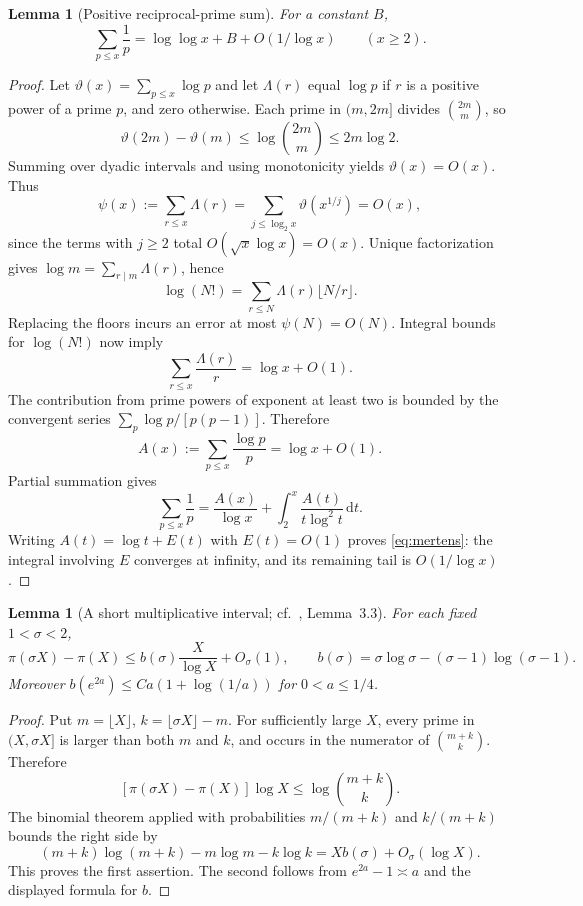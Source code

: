 \documentclass[11pt]{article}
\newtheorem{lemma}[theorem]{Lemma}
\theoremstyle{remark}\newtheorem{remark}[theorem]{Remark}
\newcommand{\dd}{\,\mathrm d}
\begin{document}
\begin{lemma}[Positive reciprocal-prime sum]\label{lem:mertens}
For a constant $B$,
\begin{equation}\label{eq:mertens}
 \sum_{p\le x}\frac1p=\log\log x+B+O(1/\log x)
 \qquad(x\ge2).
\end{equation}
\end{lemma}
\begin{proof}
Let $\vartheta(x)=\sum_{p\le x}\log p$ and let $\Lambda(r)$ equal $\log p$ if $r$ is a positive power of a prime $p$, and zero otherwise. Each prime in $(m,2m]$ divides $\binom{2m}{m}$, so
\[
 \vartheta(2m)-\vartheta(m)\le\log\binom{2m}{m}\le2m\log2.
\]
Summing over dyadic intervals and using monotonicity yields $\vartheta(x)=O(x)$. Thus
\[
 \psi(x):=\sum_{r\le x}\Lambda(r)
 =\sum_{j\le\log_2x}\vartheta(x^{1/j})=O(x),
\]
since the terms with $j\ge2$ total $O(\sqrt x\log x)=O(x)$. Unique factorization gives $\log m=\sum_{r\mid m}\Lambda(r)$, hence
\[
 \log(N!)=\sum_{r\le N}\Lambda(r)\lfloor N/r\rfloor.
\]
Replacing the floors incurs an error at most $\psi(N)=O(N)$. Integral bounds for $\log(N!)$ now imply
\[
 \sum_{r\le x}\frac{\Lambda(r)}r=\log x+O(1).
\]
The contribution from prime powers of exponent at least two is bounded by the convergent series $\sum_p\log p/[p(p-1)]$. Therefore
\[
 A(x):=\sum_{p\le x}\frac{\log p}{p}=\log x+O(1).
\]
Partial summation gives
\[
 \sum_{p\le x}\frac1p
 =\frac{A(x)}{\log x}+\int_2^x\frac{A(t)}{t\log^2t}\dd t.
\]
Writing $A(t)=\log t+E(t)$ with $E(t)=O(1)$ proves \eqref{eq:mertens}: the integral involving $E$ converges at infinity, and its remaining tail is $O(1/\log x)$.
\end{proof}

\begin{lemma}[A short multiplicative interval; cf.~\cite{Richter}, Lemma~3.3]\label{lem:interval}
For each fixed $1<\sigma<2$,
\[
 \pi(\sigma X)-\pi(X)
 \le b(\sigma)\frac X{\log X}+O_\sigma(1),\qquad
 b(\sigma)=\sigma\log\sigma-(\sigma-1)\log(\sigma-1).
\]
Moreover $b(e^{2a})\le C a(1+\log(1/a))$ for $0<a\le1/4$.
\end{lemma}
\begin{proof}
Put $m=\lfloor X\rfloor$, $k=\lfloor\sigma X\rfloor-m$. For sufficiently large $X$, every prime in $(X,\sigma X]$ is larger than both $m$ and $k$, and occurs in the numerator of $\binom{m+k}{k}$. Therefore
\[
 [\pi(\sigma X)-\pi(X)]\log X\le\log\binom{m+k}{k}.
\]
The binomial theorem applied with probabilities $m/(m+k)$ and $k/(m+k)$ bounds the right side by
\[
 (m+k)\log(m+k)-m\log m-k\log k
 =Xb(\sigma)+O_\sigma(\log X).
\]
This proves the first assertion. The second follows from $e^{2a}-1\asymp a$ and the displayed formula for $b$.
\end{proof}
\end{document}

